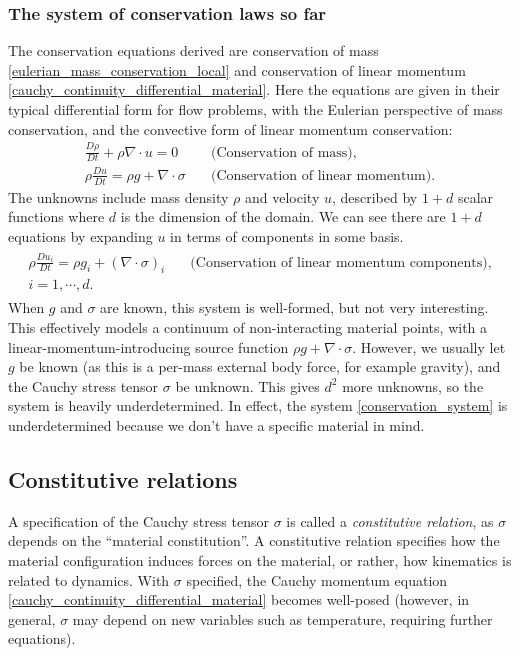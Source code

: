 \documentclass[11pt,a4paper]{memoir}
\begin{document}
\subsubsection{The system of conservation laws so far}
The conservation equations derived are conservation of mass \eqref{eulerian_mass_conservation_local} and conservation of linear momentum \eqref{cauchy_continuity_differential_material}.
Here the equations are given in their typical differential form for flow problems, with the Eulerian perspective of mass conservation, and the
convective form of linear momentum conservation:
\begin{equation}\label{conservation_system}
\begin{split}
    \frac{D\rho}{Dt} + \rho\nabla\cdot u = 0 &\quad\text{(Conservation of mass)},
    \\
    \rho\frac{Du}{Dt} = \rho g + \nabla\cdot\sigma &\quad\text{(Conservation of linear momentum)}.
\end{split}
\end{equation}
The unknowns include mass density $\rho$ and velocity $u$, described by $1 + d$ scalar functions where $d$ is the dimension of the domain.
We can see there are $1 + d$ equations by expanding $u$ in terms of components in some basis.
\begin{align*}
\begin{split}
    \rho\frac{Du_i}{Dt} = \rho g_i + \left(\nabla\cdot\sigma\right)_i &\quad\text{(Conservation of linear momentum components)},
    \\
    i=1,\cdots,d. &
\end{split}
\end{align*}
When $g$ and $\sigma$ are known, this system is well-formed, but not very interesting.
This effectively models a continuum of non-interacting material points, with a linear-momentum-introducing source function $\rho g + \nabla\cdot \sigma$.
However, we usually let $g$ be known (as this is a per-mass external body force, for example gravity), and the Cauchy stress tensor $\sigma$ be unknown.
This gives $d^2$ more unknowns, so the system is heavily underdetermined. In effect, the system \eqref{conservation_system} is
underdetermined because we don't have a specific material in mind.

\subsection{Constitutive relations}
A specification of the Cauchy stress tensor $\sigma$ is called a \textit{constitutive relation},
as $\sigma$ depends on the ``material constitution''.
A constitutive relation specifies how the material configuration
induces forces on the material, or rather, how kinematics is related to dynamics. With $\sigma$ specified, the Cauchy momentum equation \eqref{cauchy_continuity_differential_material} becomes well-posed
(however, in general, $\sigma$ may depend on new variables such as temperature, requiring further equations).
\end{document}
